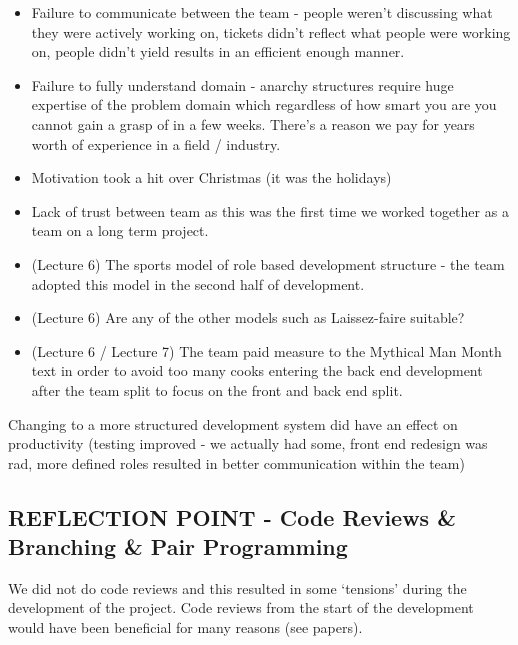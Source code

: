 \documentclass{l3proj}
\begin{document}
\begin{itemize}
\item Failure to communicate between the team - people weren’t discussing what they were actively working on, tickets didn’t reflect what people were working on, people didn’t yield results in an efficient enough manner.
\item Failure to fully understand domain - anarchy structures require huge expertise of the problem domain which regardless of how smart you are you cannot gain a grasp of in a few weeks. There’s a reason we pay for years worth of experience in a field / industry.
\item Motivation took a hit over Christmas (it was the holidays)
\item Lack of trust between team as this was the first time we worked together as a team on a long term project.
\item (Lecture 6) The sports model of role based development structure - the team adopted this model in the second half of development.
\item (Lecture 6) Are any of the other models such as Laissez-faire suitable?
\item (Lecture 6 / Lecture 7) The team paid measure to the Mythical Man Month text in order to avoid too many cooks entering the back end development after the team split to focus on the front and back end split.
\end{itemize}

Changing to a more structured development system did have an effect on productivity (testing improved - we actually had some, front end redesign was rad, more defined roles resulted in better communication within the team)



\subsection{REFLECTION POINT - Code Reviews \& Branching \& Pair Programming}
\label{sec:codereviewbranch}
We did not do code reviews and this resulted in some ‘tensions’ during the development of the project. Code reviews from the start of the development would have been beneficial for many reasons (see papers).
\end{document}

